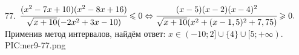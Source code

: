 77. $\cfrac{(x^2-7x+10)(x^2-8x+16)}{\sqrt{x+10}(-2x^2+3x-10)}\leqslant 0\Leftrightarrow \cfrac{(x-5)(x-2)(x-4)^2}{\sqrt{x+10}(x^2+(x-1,5)^2+7,75)}\geqslant 0.$
Применив метод интервалов, найдём ответ: $x\in(-10;2]\cup\{4\}\cup[5;+\infty).$
{{PIC:ner9-77.png}}\\
